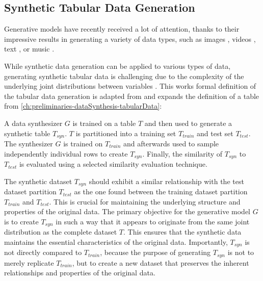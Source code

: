 \subsection{Synthetic Tabular Data Generation}
\label{sec: synthetic tabular data generation}

Generative models have recently received a lot of attention, thanks to their impressive results in generating a variety of data types, 
such as images \cite{ho2020DenoisingDiffusionProbabilistic, dhariwal2021DiffusionModelsBeat, rombach2022HighResolutionImageSynthesis}, videos \cite{ho2022VideoDiffusionModels, runwayGen1Runway}, text \cite{radfordImprovingLanguageUnderstanding, openai2022ChatGPTOptimizingLanguage}, or music \cite{agostinelli2023MusicLMGeneratingMusic, Forsgren_Martiros_2022}.

While synthetic data generation can be applied to various types of data, generating synthetic tabular data is challenging due to the complexity of the underlying joint distributions between variables \cite{borisov2022DeepNeuralNetworks}.
This works formal definition of the tabular data generation is adapted from \cite[p. 2]{xu2019ModelingTabularData} and expands the definition of a table from \autoref{ch:preliminaries-dataSynthesis-tabularData}:

\begin{displayquote}
    A data synthesizer $G$ is trained on a table $T$ and then used to generate a synthetic table $T_{syn}$. %
    $T$ is partitioned into a training set $T_{train}$ and test set $T_{test}$. 
    The synthesizer $G$ is trained on $T_{train}$ and afterwards used to sample independently individual rows to create $T_{syn}$.
    Finally, the similarity of $T_{syn}$ to $T_{test}$ is evaluated using a selected similarity evaluation technique.
\end{displayquote}

The synthetic dataset $T_{syn}$ should exhibit a similar relationship with the test dataset partition $T_{test}$ 
as the one found between the training dataset partition $T_{train}$ and $T_{test}$. 
This is crucial for maintaining the underlying structure and properties of the original data.
The primary objective for the generative model $G$ is to create $T_{syn}$ in such a way that it appears to originate from the same joint distribution as the complete dataset $T$. 
This ensures that the synthetic data maintains the essential characteristics of the original data.
Importantly, $T_{syn}$ is not directly compared to $T_{train}$, because the purpose of generating $T_{syn}$ is not to merely replicate $T_{train}$,
but to create a new dataset that preserves the inherent relationships and properties of the original data.

